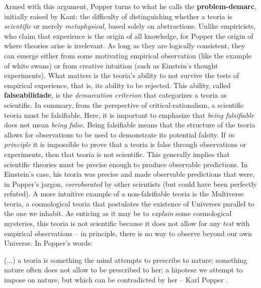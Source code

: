 \documentclass[./main_en.tex]{subfiles}
\begin{document}
\par Armed with this argument, Popper turns to what he calls the \textbf{\gls{problem-demarc}}, initially raised by Kant: the difficulty of distinguishing whether a \gls{teoria} is \textit{scientific} or merely \textit{metaphysical}, based solely on abstractions. Unlike empiricists, who claim that experience is the origin of all knowledge, for Popper the origin of where theories arise is irrelevant. As long as they are logically consistent, they can emerge either from some motivating empirical observation (like the example of white swans) or from creative intuition (such as Einstein's thought experiments). What matters is the \gls{teoria}’s ability to not survive the tests of empirical experience, that is, its ability to be rejected. This ability, called \textbf{\gls{falseabilidade}}, is the \textit{demarcation criterion} that categorizes a \gls{teoria} as scientific. In summary, from the perspective of \gls{critical-rationalism}, a scientific \gls{teoria} must be falsifiable. Here, it is important to emphasize that \textit{being falsifiable} does not mean \textit{being false}. Being falsifiable means that the structure of the \gls{teoria} allows for observations to be used to demonstrate its potential falsity. If \textit{in principle} it is impossible to prove that a \gls{teoria} is false through observations or experiments, then that \gls{teoria} is not scientific. This generally implies that scientific theories must be precise enough to produce observable predictions. In Einstein's case, his \gls{teoria} was precise and made observable predictions that were, in Popper's jargon, \textit{corroborated} by other scientists (but could have been perfectly refuted). A more intuitive example of a non-falsifiable \gls{teoria} is the Multiverse \gls{teoria}, a cosmological \gls{teoria} that postulates the existence of Universes parallel to the one we inhabit. As enticing as it may be to \textit{explain} some cosmological mysteries, this \gls{teoria} is not scientific because it does not allow for any \textit{test} with empirical observations – in principle, there is no way to observe beyond our own Universe. In Popper's words:

\begin{adjustwidth}{100pt}{0pt}
\medskip
\small (...) a \gls{teoria} is something the mind attempts to prescribe to nature; something nature often does not allow to be prescribed to her; a \gls{hipotese} we attempt to impose on nature, but which can be contradicted by her -- Karl Popper \cite{popper2013dois}.
\medskip
\end{adjustwidth}
\end{document}
